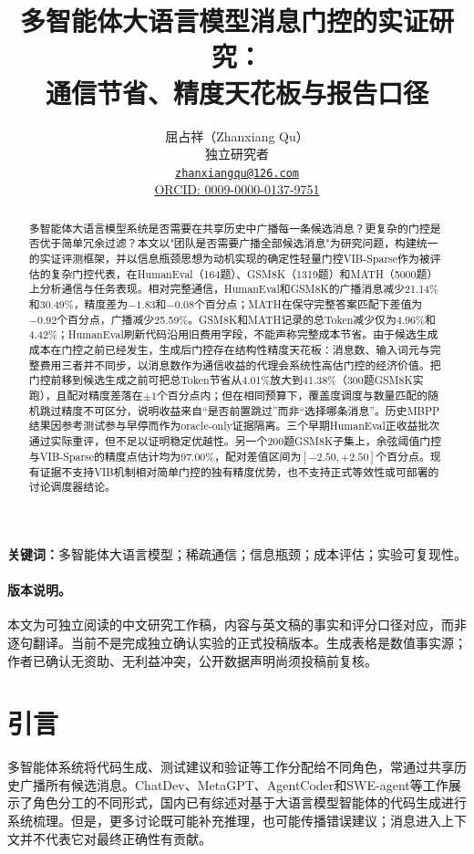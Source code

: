 \documentclass[11pt,a4paper]{article}
\title{多智能体大语言模型消息门控的实证研究：\\通信节省、精度天花板与报告口径}
\author{屈占祥（Zhanxiang Qu）\\独立研究者\\
  \href{mailto:zhanxiangqu@126.com}{\texttt{zhanxiangqu@126.com}}\\
  \href{https://orcid.org/0009-0000-0137-9751}{ORCID: 0009-0000-0137-9751}}
\date{}
\begin{document}
\maketitle
\begin{abstract}
多智能体大语言模型系统是否需要在共享历史中广播每一条候选消息？更复杂的门控是否优于简单冗余过滤？本文以"团队是否需要广播全部候选消息"为研究问题，构建统一的实证评测框架，并以信息瓶颈思想为动机实现的确定性轻量门控VIB-Sparse作为被评估的复杂门控代表，在HumanEval（164题）、GSM8K（1319题）和MATH（5000题）上分析通信与任务表现。相对完整通信，HumanEval和GSM8K的广播消息减少21.14\%和30.49\%，精度差为$-1.83$和$-0.08$个百分点；MATH在保守完整答案匹配下差值为$-0.92$个百分点，广播减少25.59\%。GSM8K和MATH记录的总Token减少仅为4.96\%和4.42\%；HumanEval刷新代码沿用旧费用字段，不能声称完整成本节省。由于候选生成成本在门控之前已经发生，生成后门控存在结构性精度天花板：消息数、输入词元与完整费用三者并不同步，以消息数作为通信收益的代理会系统性高估门控的经济价值。把门控前移到候选生成之前可把总Token节省从4.01\%放大到41.38\%（300题GSM8K实跑），且配对精度差落在$\pm1$个百分点内；但在相同预算下，覆盖度调度与数量匹配的随机跳过精度不可区分，说明收益来自“是否前置跳过”而非“选择哪条消息”。历史MBPP结果因参考测试参与早停而作为oracle-only证据隔离。三个早期HumanEval正收益批次通过实际重评，但不足以证明稳定优越性。另一个200题GSM8K子集上，余弦阈值门控与VIB-Sparse的精度点估计均为97.00\%，配对差值区间为$[-2.50,+2.50]$个百分点。现有证据不支持VIB机制相对简单门控的独有精度优势，也不支持正式等效性或可部署的讨论调度器结论。
\end{abstract}
\noindent\textbf{关键词：}多智能体大语言模型；稀疏通信；信息瓶颈；成本评估；实验可复现性。

\paragraph{版本说明。}
本文为可独立阅读的中文研究工作稿，内容与英文稿的事实和评分口径对应，而非逐句翻译。当前不是完成独立确认实验的正式投稿版本。生成表格是数值事实源；作者已确认无资助、无利益冲突，公开数据声明尚须投稿前复核。

\section{引言}
多智能体系统将代码生成、测试建议和验证等工作分配给不同角色，常通过共享历史广播所有候选消息。ChatDev、MetaGPT、AgentCoder和SWE-agent等工作展示了角色分工的不同形式\citep{qian2023chatdev,hong2023metagpt,du2023agentcoder,yang2024sweagent}，国内已有综述对基于大语言模型智能体的代码生成进行系统梳理\citep{dong2026codereview}。但是，更多讨论既可能补充推理，也可能传播错误建议；消息进入上下文并不代表它对最终正确性有贡献。
\end{document}
